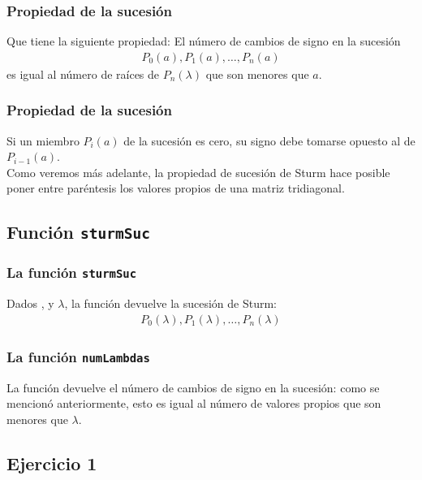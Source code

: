 \documentclass[12pt]{beamer}
\begin{document}
\begin{frame}
\frametitle{Propiedad de la sucesión}
Que tiene la siguiente propiedad: \pause El número de cambios de signo en la sucesión
\begin{align*}
P_{0} (a), P_{1} (a), \ldots, P_{n} (a)
\end{align*}
es igual al número de raíces de $P_{n} (\lambda)$ que son menores que $a$.
\end{frame}
\begin{frame}
\frametitle{Propiedad de la sucesión}
Si un miembro $P_{i} (a)$ de la sucesión es cero, su signo debe tomarse opuesto al de $P_{i-1} (a)$.
\\
\bigskip
\pause
Como veremos más adelante, la propiedad de sucesión de Sturm hace posible poner entre paréntesis los valores propios de una matriz tridiagonal.
\end{frame}

\subsection{Función \texttt{sturmSuc}}

\begin{frame}
\frametitle{La función \texttt{sturmSuc}}
Dados ,  y $\lambda$, la función  devuelve la sucesión de Sturm:
\pause
\begin{align*}
P_{0} (\lambda), P_{1} (\lambda) , \ldots, P_{n} (\lambda)
\end{align*}
\end{frame}
\begin{frame}
\frametitle{La función \texttt{numLambdas}}
La función  devuelve el número de cambios de signo en la sucesión: \pause como se mencionó anteriormente, esto es igual al número de valores propios que son menores que $\lambda$.
\end{frame}

\subsection{Ejercicio 1}
\end{document}
